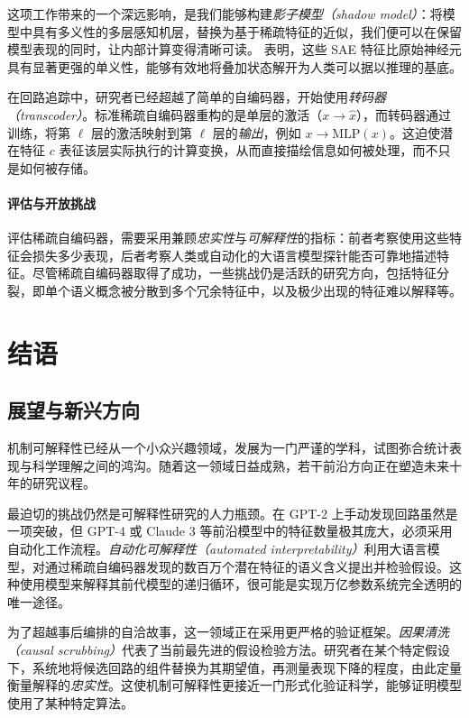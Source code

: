 这项工作带来的一个深远影响，是我们能够构建\emph{影子模型（shadow model）}：将模型中具有多义性的多层感知机层，替换为基于稀疏特征的近似，我们便可以在保留模型表现的同时，让内部计算变得清晰可读。\citet{bricken2023monosemanticity} 表明，这些 SAE 特征比原始神经元具有显著更强的单义性，能够有效地将叠加状态解开为人类可以据以推理的基底。

在回路追踪中，研究者已经超越了简单的自编码器，开始使用\emph{转码器（transcoder）}\citep{dunefsky2024transcoders}。标准稀疏自编码器重构的是单层的激活（$x \rightarrow \hat{x}$），而转码器通过训练，将第 $\ell$ 层的激活映射到第 $\ell$ 层的\emph{输出}，例如 $x \rightarrow \text{MLP}(x)$。这迫使潜在特征 $c$ 表征该层实际执行的计算变换，从而直接描绘信息如何被处理，而不只是如何被存储。

\paragraph{评估与开放挑战}
评估稀疏自编码器，需要采用兼顾\emph{忠实性}与\emph{可解释性}的指标：前者考察使用这些特征会损失多少表现，后者考察人类或自动化的大语言模型探针能否可靠地描述特征。尽管稀疏自编码器取得了成功，一些挑战仍是活跃的研究方向，包括特征分裂，即单个语义概念被分散到多个冗余特征中，以及极少出现的特征难以解释等。

\section{结语}
\subsection{展望与新兴方向}

机制可解释性已经从一个小众兴趣领域，发展为一门严谨的学科，试图弥合统计表现与科学理解之间的鸿沟。随着这一领域日益成熟，若干前沿方向正在塑造未来十年的研究议程。

最迫切的挑战仍然是可解释性研究的人力瓶颈。在 GPT-2 上手动发现回路虽然是一项突破，但 GPT-4 或 Claude 3 等前沿模型中的特征数量极其庞大，必须采用自动化工作流程。\emph{自动化可解释性（automated interpretability）}\citep{bills2023language}利用大语言模型，对通过稀疏自编码器发现的数百万个潜在特征的语义含义提出并检验假设。这种使用模型来解释其前代模型的递归循环，很可能是实现万亿参数系统完全透明的唯一途径。

为了超越事后编排的自洽故事，这一领域正在采用更严格的验证框架。\emph{因果清洗（causal scrubbing）}\citep{chan2022causal}代表了当前最先进的假设检验方法。研究者在某个特定假设下，系统地将候选回路的组件替换为其期望值，再测量表现下降的程度，由此定量衡量解释的\emph{忠实性}。这使机制可解释性更接近一门形式化验证科学，能够证明模型使用了某种特定算法。

